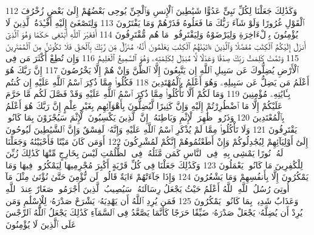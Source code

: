 {\tiny\colorbox{cl_aya}{112}} وَكَذَٰلِكَ جَعَلْنَا لِكُلِّ نَبِىٍّ عَدُوًّا شَيَٰطِينَ ٱلْإِنسِ وَٱلْجِنِّ يُوحِى بَعْضُهُمْ إِلَىٰ بَعْضٍ زُخْرُفَ ٱلْقَوْلِ غُرُورًا وَلَوْ شَآءَ رَبُّكَ مَا فَعَلُوهُ فَذَرْهُمْ وَمَا يَفْتَرُونَ
{\tiny\colorbox{cl_aya}{113}} وَلِتَصْغَىٰٓ إِلَيْهِ أَفْـِٔدَةُ ٱلَّذِينَ لَا يُؤْمِنُونَ بِٱلْءَاخِرَةِ وَلِيَرْضَوْهُ وَلِيَقْتَرِفُوا۟ مَا هُم مُّقْتَرِفُونَ
{\tiny\colorbox{cl_aya}{114}} أَفَغَيْرَ ٱللَّهِ أَبْتَغِى حَكَمًا وَهُوَ ٱلَّذِىٓ أَنزَلَ إِلَيْكُمُ ٱلْكِتَٰبَ مُفَصَّلًا وَٱلَّذِينَ ءَاتَيْنَٰهُمُ ٱلْكِتَٰبَ يَعْلَمُونَ أَنَّهُۥ مُنَزَّلٌ مِّن رَّبِّكَ بِٱلْحَقِّ فَلَا تَكُونَنَّ مِنَ ٱلْمُمْتَرِينَ
{\tiny\colorbox{cl_aya}{115}} وَتَمَّتْ كَلِمَتُ رَبِّكَ صِدْقًا وَعَدْلًا لَّا مُبَدِّلَ لِكَلِمَٰتِهِۦ وَهُوَ ٱلسَّمِيعُ ٱلْعَلِيمُ
{\tiny\colorbox{cl_aya}{116}} وَإِن تُطِعْ أَكْثَرَ مَن فِى ٱلْأَرْضِ يُضِلُّوكَ عَن سَبِيلِ ٱللَّهِ إِن يَتَّبِعُونَ إِلَّا ٱلظَّنَّ وَإِنْ هُمْ إِلَّا يَخْرُصُونَ
{\tiny\colorbox{cl_aya}{117}} إِنَّ رَبَّكَ هُوَ أَعْلَمُ مَن يَضِلُّ عَن سَبِيلِهِۦ وَهُوَ أَعْلَمُ بِٱلْمُهْتَدِينَ
{\tiny\colorbox{cl_aya}{118}} فَكُلُوا۟ مِمَّا ذُكِرَ ٱسْمُ ٱللَّهِ عَلَيْهِ إِن كُنتُم بِـَٔايَٰتِهِۦ مُؤْمِنِينَ
{\tiny\colorbox{cl_aya}{119}} وَمَا لَكُمْ أَلَّا تَأْكُلُوا۟ مِمَّا ذُكِرَ ٱسْمُ ٱللَّهِ عَلَيْهِ وَقَدْ فَصَّلَ لَكُم مَّا حَرَّمَ عَلَيْكُمْ إِلَّا مَا ٱضْطُرِرْتُمْ إِلَيْهِ وَإِنَّ كَثِيرًا لَّيُضِلُّونَ بِأَهْوَآئِهِم بِغَيْرِ عِلْمٍ إِنَّ رَبَّكَ هُوَ أَعْلَمُ بِٱلْمُعْتَدِينَ
{\tiny\colorbox{cl_aya}{120}} وَذَرُوا۟ ظَٰهِرَ ٱلْإِثْمِ وَبَاطِنَهُۥٓ إِنَّ ٱلَّذِينَ يَكْسِبُونَ ٱلْإِثْمَ سَيُجْزَوْنَ بِمَا كَانُوا۟ يَقْتَرِفُونَ
{\tiny\colorbox{cl_aya}{121}} وَلَا تَأْكُلُوا۟ مِمَّا لَمْ يُذْكَرِ ٱسْمُ ٱللَّهِ عَلَيْهِ وَإِنَّهُۥ لَفِسْقٌ وَإِنَّ ٱلشَّيَٰطِينَ لَيُوحُونَ إِلَىٰٓ أَوْلِيَآئِهِمْ لِيُجَٰدِلُوكُمْ وَإِنْ أَطَعْتُمُوهُمْ إِنَّكُمْ لَمُشْرِكُونَ
{\tiny\colorbox{cl_aya}{122}} أَوَمَن كَانَ مَيْتًا فَأَحْيَيْنَٰهُ وَجَعَلْنَا لَهُۥ نُورًا يَمْشِى بِهِۦ فِى ٱلنَّاسِ كَمَن مَّثَلُهُۥ فِى ٱلظُّلُمَٰتِ لَيْسَ بِخَارِجٍ مِّنْهَا كَذَٰلِكَ زُيِّنَ لِلْكَٰفِرِينَ مَا كَانُوا۟ يَعْمَلُونَ
{\tiny\colorbox{cl_aya}{123}} وَكَذَٰلِكَ جَعَلْنَا فِى كُلِّ قَرْيَةٍ أَكَٰبِرَ مُجْرِمِيهَا لِيَمْكُرُوا۟ فِيهَا وَمَا يَمْكُرُونَ إِلَّا بِأَنفُسِهِمْ وَمَا يَشْعُرُونَ
{\tiny\colorbox{cl_aya}{124}} وَإِذَا جَآءَتْهُمْ ءَايَةٌ قَالُوا۟ لَن نُّؤْمِنَ حَتَّىٰ نُؤْتَىٰ مِثْلَ مَآ أُوتِىَ رُسُلُ ٱللَّهِ ٱللَّهُ أَعْلَمُ حَيْثُ يَجْعَلُ رِسَالَتَهُۥ سَيُصِيبُ ٱلَّذِينَ أَجْرَمُوا۟ صَغَارٌ عِندَ ٱللَّهِ وَعَذَابٌ شَدِيدٌۢ بِمَا كَانُوا۟ يَمْكُرُونَ
{\tiny\colorbox{cl_aya}{125}} فَمَن يُرِدِ ٱللَّهُ أَن يَهْدِيَهُۥ يَشْرَحْ صَدْرَهُۥ لِلْإِسْلَٰمِ وَمَن يُرِدْ أَن يُضِلَّهُۥ يَجْعَلْ صَدْرَهُۥ ضَيِّقًا حَرَجًا كَأَنَّمَا يَصَّعَّدُ فِى ٱلسَّمَآءِ كَذَٰلِكَ يَجْعَلُ ٱللَّهُ ٱلرِّجْسَ عَلَى ٱلَّذِينَ لَا يُؤْمِنُونَ
